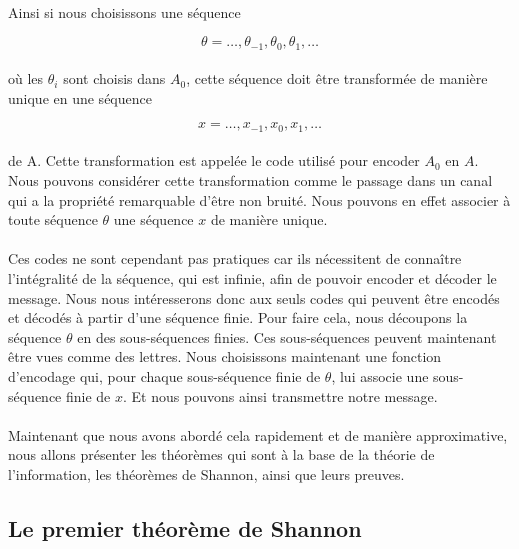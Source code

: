 	\paragraph{}
	Ainsi si nous choisissons une séquence

	\[\theta = \dots,\theta_{-1},\theta_{0},\theta_{1},\dots\]

	\paragraph{}
	où les $\theta_i$ sont choisis dans $A_0$, cette séquence doit être transformée de manière unique en une séquence

	\[x = \dots,x_{-1},x_{0},x_{1},\dots\]

	\paragraph{}
	de A. Cette transformation est appelée le code utilisé pour encoder $A_0$ en $A$. Nous pouvons considérer cette 
	transformation comme le passage dans un canal qui a la propriété remarquable d'être non bruité.
	Nous pouvons en effet associer à toute séquence $\theta$ une séquence $x$ de manière unique. 

	\paragraph{}
	Ces codes ne sont cependant pas pratiques car ils nécessitent de connaître l'intégralité de la séquence, qui est 
	infinie, afin de pouvoir encoder et décoder le message. Nous  nous intéresserons donc aux seuls codes qui peuvent être encodés et 
	décodés à partir d'une séquence 
	finie. Pour faire cela, nous découpons la séquence $\theta$ en des sous-séquences finies. 
	Ces sous-séquences peuvent maintenant être vues comme des lettres. Nous choisissons maintenant une fonction d'encodage qui, pour 
	chaque sous-séquence finie de $\theta$, lui associe une sous-séquence finie de $x$. Et nous pouvons ainsi transmettre notre message.
	
	\paragraph{}
	Maintenant que nous avons abordé cela rapidement et de manière 
	approximative, nous allons présenter les théorèmes qui sont à la base
	de la théorie de l'information, les théorèmes
	de Shannon, ainsi que leurs preuves.

\subsection{Le premier théorème de Shannon}

